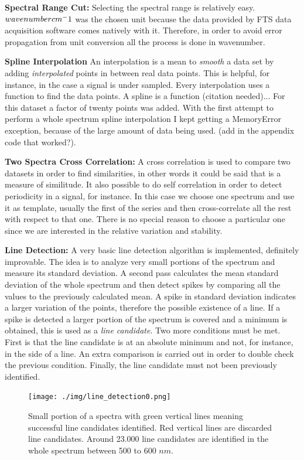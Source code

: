 \documentclass[master,       %
               twoside,        %
               BCOR10mm,       %
               ngerman,english  %
               ]{GAUBM_astro}
\begin{document}
\textbf{Spectral Range Cut:} Selecting the spectral range is relatively easy. $wavenumber\\ cm^-1$ was the chosen unit because the data provided by
FTS data acquisition software comes natively with it. Therefore, in order to avoid error propagation from unit conversion all the process is done in wavenumber.


\textbf{Spline Interpolation} An interpolation is a mean to \emph{smooth} a data set by adding \emph{interpolated} points in between real data points.
This is helpful, for instance, in the case a signal is under sampled. Every interpolation uses a function to find the data points. 
A spline is a function (citation needed)... For this dataset a factor of twenty points was added. With the first attempt to perform a whole spectrum
spline interpolation I kept getting a MemoryError exception, because of the large amount of data being used. (add in the appendix code that worked?).

\textbf{Two Spectra Cross Correlation:} A cross correlation is used to compare two datasets in order to find similarities, in other words it could be
said that is a measure of similitude. It also possible to do self correlation in order to detect periodicity in a signal, for instance. In this case
we choose one spectrum and use it as template, usually the first of the series and then cross-correlate all the rest with respect to that one. 
There is no special reason to choose a particular one since we are interested in the relative variation and stability.

\textbf{Line Detection:} A very basic line detection algorithm is implemented, definitely improvable. The idea is to analyze very small portions of
the spectrum and measure its standard deviation. A second pass calculates the mean standard deviation of the whole spectrum and then detect 
spikes by comparing all the values to the previously calculated mean. A spike in standard deviation indicates a larger variation of the points, 
therefore the possible existence of a line. If a spike is detected a larger portion of the spectrum is covered and a minimum is obtained, 
this is used as a \emph{line candidate}. Two more conditions must be met. First is that the line candidate is at an absolute minimum and not, 
for instance, in the side of a line. An extra comparison is carried out in order to double check the previous condition. Finally, the line candidate must 
not been previously identified.

\begin{figure}
 \centering
 \texttt{[image: ./img/line\_detection0.png]}
 \caption{Small portion of a spectra with green vertical lines meaning successful line candidates identified. Red vertical lines are discarded line candidates. Around 23.000 line candidates are identified in the whole spectrum between 500 to 600 $nm$.}
 \label{fig:line_detection}
\end{figure}
\end{document}

